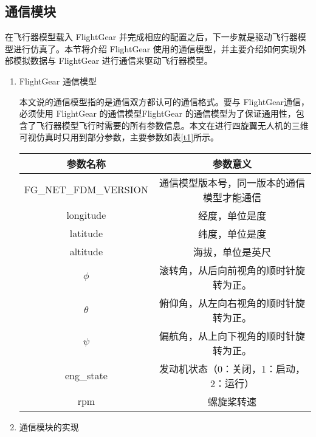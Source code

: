 \subsection{通信模块}
在飞行器模型载入 FlightGear 并完成相应的配置之后，下一步就是驱动飞行器模型进行仿真了。本节将介绍 FlightGear 使用的通信模型，并主要介绍如何实现外部模拟数据与 FlightGear 进行通信来驱动飞行器模型。

\begin{enumerate}
  \item  FlightGear 通信模型

本文说的通信模型指的是通信双方都认可的通信格式。要与 FlightGear通信，必须使用 FlightGear 的通信模型FlightGear 的通信模型为了保证通用性，包含了飞行器模型飞行时需要的所有参数信息。本文在进行四旋翼无人机的三维可视仿真时只用到部分参数，主要参数如表\ref{t1}所示。
\newpage
\begin{table}[!h]\label{t1}
\begin{center}
\caption{四旋翼无人机飞行需要的主要参数}\label{t1}
\begin{longtable}{ | c| c|}
\hline
参数名称                                    & 参数意义                                                                  \\\hline
FG\_NET\_FDM\_VERSION                     & 通信模型版本号，同一版本的通信模型才能通信
                               \\\hline
longitude           & 经度，单位是度
                                   \\\hline
latitude              & 纬度，单位是度
                                            \\\hline
altitude                     & 海拔，单位是英尺

                                          \\\hline
$\phi $             & 滚转角，从后向前视角的顺时针旋转为正。
\\\hline
$\theta $ &俯仰角，从左向右视角的顺时针旋转为正。
\\\hline
$\psi $  &  偏航角，从上向下视角的顺时针旋转为正。
\\\hline
eng\_state  &   发动机状态（0：关闭，1：启动，2：运行）
\\\hline
rpm &  螺旋桨转速
\\\hline
\end{longtable}
\end{center}
\end{table}
\vspace{-40pt}
 \item 通信模块的实现


\end{enumerate}
